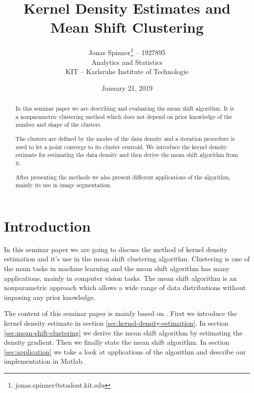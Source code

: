 \documentclass{article}
\begin{document}
\title{Kernel Density Estimates and Mean Shift Clustering}
\author{Jonas Spinner\thanks{jonas.spinner@student.kit.edu} \enspace -- 1927895\\
	Analytics and Statistics\\
	KIT -- Karlsruhe Institute of Technologie}
\date{January 21, 2019}
\maketitle

\newpage

\tableofcontents

\newpage

\listoffigures

\listoftables

\listofalgorithms

\listofcodes


\newpage


\begin{abstract}
	In this seminar paper we are describing and evaluating the mean shift algorithm. It is a nonparametric clustering method which does not depend on prior knowledge of the number and shape of the clusters.
	
	The clusters are defined by the modes of the data density and a iteration procedure is used to let a point converge to its cluster centroid. We introduce the kernel density estimate for estimating the data density and then derive the mean shift algorithm from it.
	
	After presenting the methods we also present different applications of the algorithm, mainly its use in image segmentation.
\end{abstract}

\section{Introduction}

In this seminar paper we are going to discuss the method of kernel density estimation and it's use in the mean shift clustering algorithm. Clustering is one of the main tasks in machine learning and the mean shift algorithm has many applications, mainly in computer vision tasks. The mean shift algorithm is an nonparametric approach which allows a wide range of data distributions without imposing any prior knowledge.

The content of this seminar paper is mainly based on \cite{Comaniciu.2002}. First we introduce the kernel density estimate in section \ref{sec:kernel-density-estimation}. In section \ref{sec:mean-shift-clustering} we derive the mean shift algorithm by estimating the density gradient. Then we finally state the mean shift algorithm. In section \ref{sec:application} we take a look at applications of the algorithm and describe our implementation in Matlab.
\end{document}
